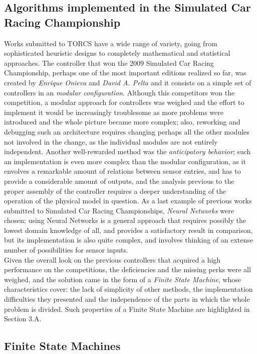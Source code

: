 \subsection{Algorithms implemented in the Simulated Car Racing Championship}

	Works submitted to TORCS have a wide range of variety, going from sophisticated heuristic designs to completely mathematical
	and statistical approaches. The controller that won the 2009 Simulated Car Racing Championship, \cite{2009SCR} %
	perhaps one of the most important editions realized so far, was created by \emph{Enrique Onieva} and \emph{David A. Pelta}%
	and it consists on a simple set of controllers in an \emph{modular configuration}. Although this competitors won the competition,
	a modular approach for controllers was weighed and the effort to implement it would be increasingly troublesome as more
	problems were introduced and the whole picture became more complex; also, reworking and debugging such an architecture
	requires changing perhaps all the other modules not involved in the change, as the individual modules are not entirely 
	independent. Another well-rewarded method was the \emph{anticipatory behavior}; such an implementation is even more
	complex than the modular configuration, as it envolves a remarkable amount of relations between sensor entries, and has to
	provide a considerable amount of outputs, and the analysis previous to the proper assembly of the controller requires a
	deeper understanding of the operation of the physical model in question. As a last example of previous works submitted to
	Simulated Car Racing Championships, \emph{Neural Networks} were chosen; using Neural Networks is a general approach that
	requires possibly the lowest domain knowledge of all, and provides a satisfactory result in comparison, but its implementation
	is also quite complex, and involves thinking of an extense number of possibilities for sensor inputs.\\
	Given the overall look on the previous controllers that acquired a high performance on the competitions, the deficiencies and
	the missing perks were all weighed, and the solution came in the form of a \emph{Finite State Machine}, whose characteristics
	cover: the lack of simplicity of other methods, the implementation difficulties they presented and the independence of the
	parts in which the whole problem is divided. Such properties of a Finite State Machine are highlighted in Section 3.A.

\subsection{Finite State Machines}

